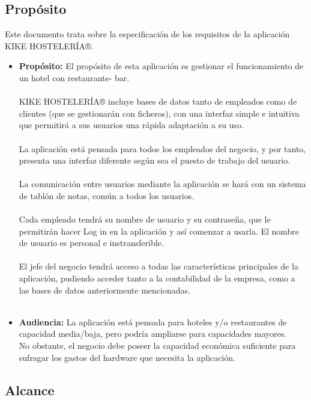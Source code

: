 \documentclass[spanish,a4paper,12pt]{report}		%
\begin{document}
\subsection{Propósito}
 	Este documento trata sobre la especificación de los requisitos de la aplicación KIKE HOSTELERÍA®.
\begin{itemize}
		\item \textbf{Propósito:} El propósito de esta aplicación es gestionar el funcionamiento de un hotel con restaurante- bar. \\\\
KIKE HOSTELERÍA® incluye bases de datos tanto de empleados como de clientes (que se gestionarán con ficheros), con una interfaz simple e intuitiva que permitirá a sus usuarios una rápida adaptación a su uso.\\\\
La aplicación está pensada para todos los empleados del negocio, y por tanto, presenta una interfaz diferente según sea el puesto de trabajo del usuario.\\\\
La comunicación entre usuarios mediante la aplicación se hará con un sistema de tablón de notas, común a todos los usuarios.\\\\
Cada empleado tendrá su nombre de usuario y su contraseña, que le permitirán hacer Log in en la aplicación y así comenzar a usarla. El nombre de usuario es personal e instransferible.\\\\
El jefe del negocio tendrá acceso a todas las características principales de la aplicación, pudiendo acceder tanto a la contabilidad de la empresa, como a las bases de datos anteriormente mencionadas. \\\\


		\item \textbf{Audiencia:} La aplicación está pensada para hoteles y/o restaurantes de capacidad media/baja, pero podría ampliarse para capacidades mayores. \\
No obstante, el negocio debe poseer la capacidad económica suficiente para sufragar los gastos del hardware que necesita la aplicación.
	\end{itemize}

\subsection{Alcance}
\end{document}
